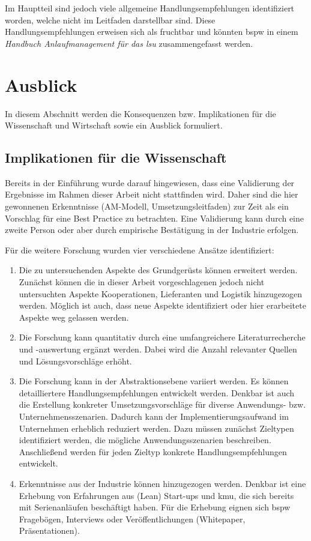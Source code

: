 Im Hauptteil sind jedoch viele allgemeine Handlungsempfehlungen identifiziert worden, welche nicht im Leitfaden darstellbar sind. Diese Handlungsempfehlungen erweisen sich als fruchtbar und könnten \gls{bspw} in einem \textit{Handbuch Anlaufmanagement für das \gls{lsu}} zusammengefasst werden. 

\section{Ausblick}

In diesem Abschnitt werden die Konsequenzen bzw. Implikationen für die Wissenschaft und Wirtschaft sowie ein Ausblick formuliert. 

\subsection*{Implikationen für die Wissenschaft}
Bereits in der Einführung wurde darauf hingewiesen, dass eine Validierung der Ergebnisse im Rahmen dieser Arbeit nicht stattfinden wird. Daher sind die hier gewonnenen Erkenntnisse (AM-Modell, Umsetzungsleitfaden) zur Zeit als ein Vorschlag für eine Best Practice zu betrachten. Eine Validierung kann durch eine zweite Person %
oder aber durch empirische Bestätigung in der Industrie erfolgen. 

Für die weitere Forschung wurden vier verschiedene Ansätze identifiziert: 

\begin{enumerate}
 \item Die zu untersuchenden Aspekte des Grundgerüsts können erweitert werden. Zunächst können die in dieser Arbeit vorgeschlagenen jedoch nicht untersuchten Aspekte Kooperationen, Lieferanten und Logistik 
 hinzugezogen werden. Möglich ist auch, dass neue Aspekte identifiziert oder hier erarbeitete Aspekte weg gelassen werden.  
\item Die Forschung kann quantitativ durch eine umfangreichere Literaturrecherche und -auswertung ergänzt werden. Dabei wird die Anzahl relevanter Quellen und Lösungsvorschläge erhöht. 
\item Die Forschung kann in der Abstraktionsebene variiert werden. Es können detailliertere Handlungsempfehlungen entwickelt werden. Denkbar ist auch die Erstellung konkreter Umsetzungsvorschläge für diverse Anwendungs- bzw. Unternehmensszenarien. Dadurch kann der Implementierungsaufwand im Unternehmen erheblich reduziert werden. Dazu müssen zunächst Zieltypen identifiziert werden, die mögliche Anwendungsszenarien beschreiben. Anschließend werden für jeden Zieltyp konkrete Handlungsempfehlungen entwickelt. 
\item Erkenntnisse aus der Industrie können hinzugezogen werden. Denkbar ist eine Erhebung von Erfahrungen aus (Lean) Start-ups und \gls{kmu}, die sich bereits mit Serienanläufen beschäftigt haben. Für die Erhebung eignen sich \gls{bspw} Fragebögen, Interviews oder Veröffentlichungen (Whitepaper, Präsentationen). 
\end{enumerate}



